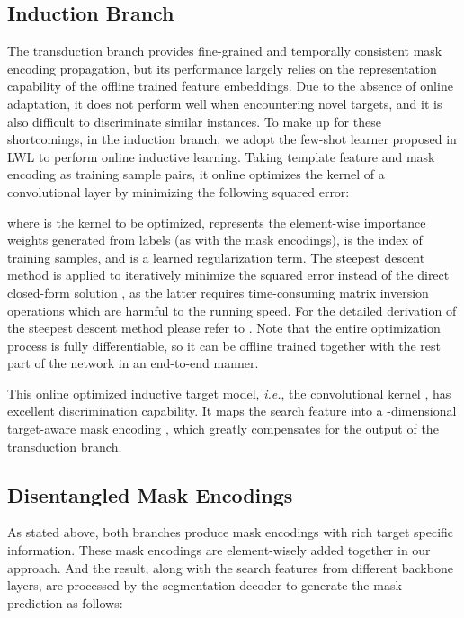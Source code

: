 \documentclass[10pt,twocolumn,letterpaper]{article}
\begin{document}
\subsection{Induction Branch}\label{subsection:db}
The transduction branch provides fine-grained and temporally consistent mask encoding propagation, but its performance largely relies on the representation capability of the offline trained feature embeddings. Due to the absence of online adaptation, it does not perform well when encountering novel targets, and it is also difficult to discriminate similar instances. To make up for these shortcomings, in the induction branch, we adopt the few-shot learner proposed in LWL \cite{Goutam2020A} to perform online inductive learning. Taking template feature  and mask encoding  as training sample pairs, it online optimizes the kernel of a convolutional layer  by minimizing the following squared error:

where  is the kernel to be optimized,  represents the element-wise importance weights generated from labels (as with the mask encodings),  is the index of training samples, and  is a learned regularization term. The steepest descent method is applied to iteratively minimize the squared error instead of the direct closed-form solution \cite{MLCS2019A}, as the latter requires time-consuming matrix inversion operations which are harmful to the running speed. For the detailed derivation of the steepest descent method please refer to \cite{Goutam2020A}. Note that the entire optimization process is fully differentiable, so it can be offline trained together with the rest part of the network in an end-to-end manner.

This online optimized inductive target model, \textit{i.e.}, the convolutional kernel , has excellent discrimination capability. It maps the search feature  into a -dimensional target-aware mask encoding , which greatly compensates for the output of the transduction branch.


\subsection{Disentangled Mask Encodings}\label{subsection:ldl}
As stated above, both branches produce mask encodings with rich target specific information. These mask encodings are element-wisely added together in our approach. And the result, along with the search features from different backbone layers, are processed by the segmentation decoder  to generate the mask prediction  as follows:
\end{document}
